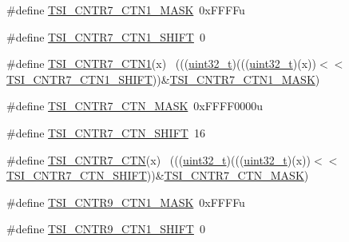 \begin{DoxyCompactItemize}
\item 
\#define \hyperlink{group___t_s_i___register___masks_ga9c4634bb590facebde26807fec2d1d3e}{T\+S\+I\+\_\+\+C\+N\+T\+R7\+\_\+\+C\+T\+N1\+\_\+\+M\+A\+SK}~0x\+F\+F\+F\+Fu
\item 
\#define \hyperlink{group___t_s_i___register___masks_ga309db3212bb128582d3368796ed78ca7}{T\+S\+I\+\_\+\+C\+N\+T\+R7\+\_\+\+C\+T\+N1\+\_\+\+S\+H\+I\+FT}~0
\item 
\#define \hyperlink{group___t_s_i___register___masks_ga23e75e19bdb0b0984d30f04bf92f667c}{T\+S\+I\+\_\+\+C\+N\+T\+R7\+\_\+\+C\+T\+N1}(x)                                            ~(((\hyperlink{_p_e___types_8h_a33594304e786b158f3fb30289278f5af}{uint32\+\_\+t})(((\hyperlink{_p_e___types_8h_a33594304e786b158f3fb30289278f5af}{uint32\+\_\+t})(x))$<$$<$\hyperlink{group___t_s_i___register___masks_ga309db3212bb128582d3368796ed78ca7}{T\+S\+I\+\_\+\+C\+N\+T\+R7\+\_\+\+C\+T\+N1\+\_\+\+S\+H\+I\+FT}))\&\hyperlink{group___t_s_i___register___masks_ga9c4634bb590facebde26807fec2d1d3e}{T\+S\+I\+\_\+\+C\+N\+T\+R7\+\_\+\+C\+T\+N1\+\_\+\+M\+A\+SK})
\item 
\#define \hyperlink{group___t_s_i___register___masks_ga7c33a7d7230526987b061c3213315f8f}{T\+S\+I\+\_\+\+C\+N\+T\+R7\+\_\+\+C\+T\+N\+\_\+\+M\+A\+SK}~0x\+F\+F\+F\+F0000u
\item 
\#define \hyperlink{group___t_s_i___register___masks_ga3601612f76d15ea71289beb7dc2c5336}{T\+S\+I\+\_\+\+C\+N\+T\+R7\+\_\+\+C\+T\+N\+\_\+\+S\+H\+I\+FT}~16
\item 
\#define \hyperlink{group___t_s_i___register___masks_gace78c34d2dc546e0a78bc9cc757b1930}{T\+S\+I\+\_\+\+C\+N\+T\+R7\+\_\+\+C\+TN}(x)                                              ~(((\hyperlink{_p_e___types_8h_a33594304e786b158f3fb30289278f5af}{uint32\+\_\+t})(((\hyperlink{_p_e___types_8h_a33594304e786b158f3fb30289278f5af}{uint32\+\_\+t})(x))$<$$<$\hyperlink{group___t_s_i___register___masks_ga3601612f76d15ea71289beb7dc2c5336}{T\+S\+I\+\_\+\+C\+N\+T\+R7\+\_\+\+C\+T\+N\+\_\+\+S\+H\+I\+FT}))\&\hyperlink{group___t_s_i___register___masks_ga7c33a7d7230526987b061c3213315f8f}{T\+S\+I\+\_\+\+C\+N\+T\+R7\+\_\+\+C\+T\+N\+\_\+\+M\+A\+SK})
\item 
\#define \hyperlink{group___t_s_i___register___masks_gac90318dbf7dc8a739eae6636a7079613}{T\+S\+I\+\_\+\+C\+N\+T\+R9\+\_\+\+C\+T\+N1\+\_\+\+M\+A\+SK}~0x\+F\+F\+F\+Fu
\item 
\#define \hyperlink{group___t_s_i___register___masks_ga22e9b412d3df505c3f1283d700c5a192}{T\+S\+I\+\_\+\+C\+N\+T\+R9\+\_\+\+C\+T\+N1\+\_\+\+S\+H\+I\+FT}~0

\end{DoxyCompactItemize}

